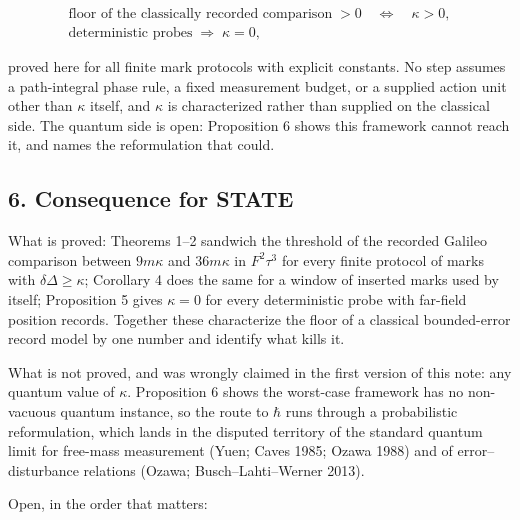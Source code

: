 \documentclass[11pt,a4paper]{article}
\begin{document}
\[\begin{gathered}
\text{floor of the classically recorded comparison}\;>0
\quad\Longleftrightarrow\quad\kappa>0,\\
\text{deterministic probes}\;\Longrightarrow\;\kappa=0,
\end{gathered}\]

proved here for all finite mark protocols with explicit constants. No
step assumes a path-integral phase rule, a fixed measurement budget, or
a supplied action unit other than \(\kappa\) itself, and \(\kappa\) is
characterized rather than supplied on the classical side. The quantum
side is open: Proposition 6 shows this framework cannot reach it, and
names the reformulation that could.

\hypertarget{consequence-for-state}{%
\subsection{6. Consequence for STATE}\label{consequence-for-state}}

What is proved: Theorems 1--2 sandwich the threshold of the recorded
Galileo comparison between \(9m\kappa\) and \(36m\kappa\) in
\(F^2\tau^3\) for every finite protocol of marks with
\(\delta\Delta\ge\kappa\); Corollary 4 does the same for a window of
inserted marks used by itself; Proposition 5 gives \(\kappa=0\) for
every deterministic probe with far-field position records. Together
these characterize the floor of a classical bounded-error record model
by one number and identify what kills it.

What is not proved, and was wrongly claimed in the first version of this
note: any quantum value of \(\kappa\). Proposition 6 shows the
worst-case framework has no non-vacuous quantum instance, so the route
to \(\hbar\) runs through a probabilistic reformulation, which lands in
the disputed territory of the standard quantum limit for free-mass
measurement (Yuen; Caves 1985; Ozawa 1988) and of error--disturbance
relations (Ozawa; Busch--Lahti--Werner 2013).

Open, in the order that matters:
\end{document}
